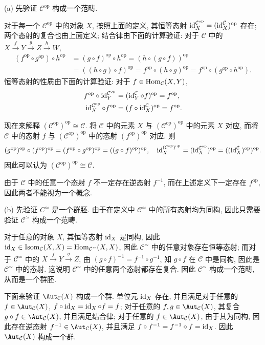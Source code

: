 \documentclass{article}
\newcommand{\op}{^{\mathrm{op}}}
\begin{document}
\begin{solution}
	(a) 先验证 $\mathcal{C}\op$ 构成一个范畴. 

	对于每一个 $\mathcal{C}\op$ 中的对象 $X$, 按照上面的定义, 其恒等态射 $\id_X^{\mathcal{C}\op} = (\id_{X}^{\mathcal{C}})\op$ 存在; 两个态射的复合也由上面定义; 结合律由下面的计算验证: 对于 $\mathcal{C}$ 中的 $X \xrightarrow{f} Y \xrightarrow{g} Z \xrightarrow{h} W$,
	\begin{align*}
		(f\op \circ g\op) \circ h\op
		&= (g \circ f)\op \circ h\op
		= (h\circ (g\circ f))\op \\
		&= ((h\circ g) \circ f)\op 
		= f\op \circ (h\circ g)\op 
		= f\op \circ (g\op \circ h\op).
	\end{align*}
	恒等态射的性质由下面的计算验证: 对于 $f \in \operatorname{Hom}_{\mathcal{C}}(X,Y)$, 
	\begin{align*}
		f\op \circ \id_Y^{\mathcal{C}\op}
		&= (\id_Y^{\mathcal{C}} \circ f)\op
		= f\op, \\
		\id_X^{\mathcal{C}\op} \circ f\op
		&= (f \circ \id_X^{\mathcal{C}}) \op
		=f\op.
	\end{align*}

	现在来解释 $(\mathcal{C}\op)\op \cong \mathcal{C}$. 将 $\mathcal{C}$ 中的元素 $X$ 与 $(\mathcal{C}\op)\op$ 中的元素 $X$ 对应, 而将 $\mathcal{C}$ 中的态射 $f$ 与 $(\mathcal{C}\op)\op$ 中的态射 $(f\op)\op$ 对应. 则
	\[ (g\op)\op \circ (f\op)\op = (f\op \circ g\op)\op = ((g\circ f)\op)\op, \quad
	\id_X^{(\mathcal{C}\op)\op} = (\id_X^{\mathcal{C}\op})\op = ((\id_X^{\mathcal{C}})\op)\op. \]
	因此可以认为 $(\mathcal{C}\op)\op \cong \mathcal{C}$.

	由于 $\mathcal{C}$ 中的任意一个态射 $f$ 不一定存在逆态射 $f^{-1}$, 而在上述定义下一定存在 $f\op$, 因此两者不能视为一个概念.

	(b) 先验证 $C^{\simeq}$ 是一个群胚. 由于在定义中 $\mathcal{C}^{\simeq}$ 中的所有态射均为同构, 因此只需要验证 $\mathcal{C}^{\simeq}$ 构成一个范畴.

	对于任意的对象 $X$, 其恒等态射 $\operatorname{id}_X$ 是同构, 因此 $\operatorname{id}_X \in \operatorname{Isom}_{\mathcal{C}}(X,X) = \operatorname{Hom}_{\mathcal{C}^{\simeq}}(X,X)$, 因此 $\mathcal{C}^{\simeq}$ 中的任意对象存在恒等态射; 而对于 $\mathcal{C}^{\simeq}$ 中的 $X \xrightarrow{f} Y \xrightarrow{g} Z$, 由 $(g\circ f)^{-1} = f^{-1} \circ g^{-1}$, 知 $g\circ f$ 在 $\mathcal{C}$ 中是同构, 因此是 $\mathcal{C}^{\simeq}$ 中的态射. 这说明 $\mathcal{C}^{\simeq}$ 中的任意两个态射都存在复合. 因此 $\mathcal{C}^{\simeq}$ 构成一个范畴, 从而是一个群胚.

	下面来验证 $\Aut_\mathcal{C} (X)$ 构成一个群. 单位元 $\operatorname{id}_X$ 存在, 并且满足对于任意的 $f\in \Aut_{\mathcal{C}}(X)$, $f\circ \operatorname{id}_X = \operatorname{id}_X \circ f = f$; 对于任意的 $f,g\in \Aut_\mathcal{C}(X)$, 其复合 $g\circ f \in \Aut_{\mathcal{C}}(X)$, 并且满足结合律; 对于任意的 $f\in \Aut_{\mathcal{C}}(X)$, 由于其为同构, 因此存在逆态射 $f^{-1}\in \Aut_{\mathcal{C}}(X)$, 并且满足 $f \circ f^{-1} = f^{-1} \circ f = \operatorname{id}_X$. 因此 $\Aut_{\mathcal{C}}(X)$ 构成一个群. 
\end{solution}
\end{document}
